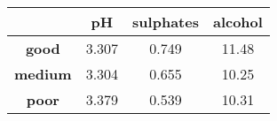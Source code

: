 \documentclass[]{article}
\begin{document}
\begin{longtable}[]{@{}cccc@{}}
\toprule
\begin{minipage}[b]{0.16\columnwidth}\centering\strut
~\strut
\end{minipage} & \begin{minipage}[b]{0.07\columnwidth}\centering\strut
pH\strut
\end{minipage} & \begin{minipage}[b]{0.15\columnwidth}\centering\strut
sulphates\strut
\end{minipage} & \begin{minipage}[b]{0.11\columnwidth}\centering\strut
alcohol\strut
\end{minipage}\tabularnewline
\midrule
\endhead
\begin{minipage}[t]{0.16\columnwidth}\centering\strut
\textbf{good}\strut
\end{minipage} & \begin{minipage}[t]{0.07\columnwidth}\centering\strut
3.307\strut
\end{minipage} & \begin{minipage}[t]{0.15\columnwidth}\centering\strut
0.749\strut
\end{minipage} & \begin{minipage}[t]{0.11\columnwidth}\centering\strut
11.48\strut
\end{minipage}\tabularnewline
\begin{minipage}[t]{0.16\columnwidth}\centering\strut
\textbf{medium}\strut
\end{minipage} & \begin{minipage}[t]{0.07\columnwidth}\centering\strut
3.304\strut
\end{minipage} & \begin{minipage}[t]{0.15\columnwidth}\centering\strut
0.655\strut
\end{minipage} & \begin{minipage}[t]{0.11\columnwidth}\centering\strut
10.25\strut
\end{minipage}\tabularnewline
\begin{minipage}[t]{0.16\columnwidth}\centering\strut
\textbf{poor}\strut
\end{minipage} & \begin{minipage}[t]{0.07\columnwidth}\centering\strut
3.379\strut
\end{minipage} & \begin{minipage}[t]{0.15\columnwidth}\centering\strut
0.539\strut
\end{minipage} & \begin{minipage}[t]{0.11\columnwidth}\centering\strut
10.31\strut
\end{minipage}\tabularnewline
\bottomrule
\end{longtable}
\end{document}
